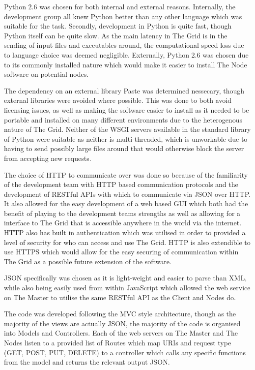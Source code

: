 Python 2.6 was chosen for both internal and external reasons. Internally, the development group all knew Python better than any other language which was suitable for the task. Secondly, development in Python is quite fast, though Python itself can be quite slow. As the main latency in The Grid is in the sending of input files and executables around, the computational speed loss due to language choice was deemed negligible. Externally, Python 2.6 was chosen due to its commonly installed nature which would make it easier to install The Node software on potential nodes. 

The dependency on an external library Paste was determined nessecary, though external libraries were avoided where possible. This was done to both avoid licensing issues, as well as making the software easier to install as it needed to be portable and installed on many different environments due to the heterogenous nature of The Grid. Neither of the WSGI servers available in the standard library of Python were suitable as neither is multi-threaded, which is unworkable due to having to send possibly large files around that would otherwise block the server from accepting new requests.

The choice of HTTP to communicate over was done so because of the familiarity of the development team with HTTP based communication protocols and the development of RESTful APIs with which to communicate via JSON over HTTP. It also allowed for the easy development of a web based GUI which both had the benefit of playing to the development teams strengths as well as allowing for a interface to The Grid that is accessible anywhere in the world via the internet. HTTP also has built in authentication which was utilised in order to provided a level of security for who can access and use The Grid. HTTP is also extendible to use HTTPS which would allow for the easy securing of communication within The Grid as a possible future extension of the software.

JSON specifically was chosen as it is light-weight and easier to parse than XML, while also being easily used from within JavaScript which allowed the web service on The Master to utilise the same RESTful API as the Client and Nodes do. 

The code was developed following the MVC style architecture, though as the majority of the views are actually JSON, the majority of the code is organised into Models and Controllers. Each of the web servers on The Master and The Nodes listen to a provided list of Routes which map URIs and request type (GET, POST, PUT, DELETE) to a controller which calls any specific functions from the model and returns the relevant output JSON.

